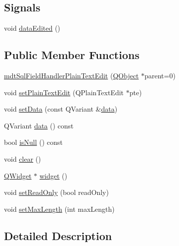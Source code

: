 \subsection*{Signals}
\begin{DoxyCompactItemize}
\item 
void \hyperlink{classmdt_sql_field_handler_plain_text_edit_a02bf9771831503a431b9b778aec58355}{data\-Edited} ()
\end{DoxyCompactItemize}
\subsection*{Public Member Functions}
\begin{DoxyCompactItemize}
\item 
\hyperlink{classmdt_sql_field_handler_plain_text_edit_a00cf7ab085c8487093e66f14185bdb06}{mdt\-Sql\-Field\-Handler\-Plain\-Text\-Edit} (\hyperlink{class_q_object}{Q\-Object} $\ast$parent=0)
\item 
void \hyperlink{classmdt_sql_field_handler_plain_text_edit_a9120d400213499850d990a7948464f6f}{set\-Plain\-Text\-Edit} (Q\-Plain\-Text\-Edit $\ast$pte)
\item 
void \hyperlink{classmdt_sql_field_handler_plain_text_edit_a4294af57a366f4798e897607174729ed}{set\-Data} (const Q\-Variant \&\hyperlink{classmdt_sql_field_handler_plain_text_edit_ad205b35b03c91658d928b2d903348a5d}{data})
\item 
Q\-Variant \hyperlink{classmdt_sql_field_handler_plain_text_edit_ad205b35b03c91658d928b2d903348a5d}{data} () const 
\item 
bool \hyperlink{classmdt_sql_field_handler_plain_text_edit_acee5d7ee57d9ea520bf70bdfe6a211f4}{is\-Null} () const 
\item 
void \hyperlink{classmdt_sql_field_handler_plain_text_edit_ac6b23b2e59967ab56dc6299dc76f6230}{clear} ()
\item 
\hyperlink{class_q_widget}{Q\-Widget} $\ast$ \hyperlink{classmdt_sql_field_handler_plain_text_edit_a6faa79f2e738582474493151aa0af886}{widget} ()
\item 
void \hyperlink{classmdt_sql_field_handler_plain_text_edit_a415de00cefa204ec7015a33e35e147e2}{set\-Read\-Only} (bool read\-Only)
\item 
void \hyperlink{classmdt_sql_field_handler_plain_text_edit_ab0e14b4df6ebd5aa5140dc44540517c6}{set\-Max\-Length} (int max\-Length)
\end{DoxyCompactItemize}


\subsection{Detailed Description}


